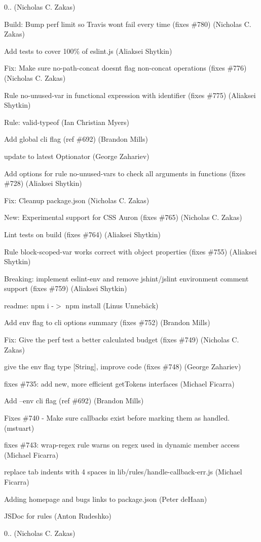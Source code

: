 \begin{DoxyItemize}
\item 0.. (Nicholas C. Zakas)
\item Build\+: Bump perf limit so Travis won\textquotesingle{}t fail every time (fixes \#780) (Nicholas C. Zakas)
\item Add tests to cover 100\% of eslint.\+js (Aliaksei Shytkin)
\item Fix\+: Make sure no-\/path-\/concat doesn\textquotesingle{}t flag non-\/concat operations (fixes \#776) (Nicholas C. Zakas)
\item Rule \textquotesingle{}no-\/unused-\/var\textquotesingle{} in functional expression with identifier (fixes \#775) (Aliaksei Shytkin)
\item Rule\+: valid-\/typeof (Ian Christian Myers)
\item Add global cli flag (ref \#692) (Brandon Mills)
\item update to latest Optionator (George Zahariev)
\item Add options for rule \textquotesingle{}no-\/unused-\/vars\textquotesingle{} to check all arguments in functions (fixes \#728) (Aliaksei Shytkin)
\item Fix\+: Cleanup package.\+json (Nicholas C. Zakas)
\item New\+: Experimental support for C\+SS Auron (fixes \#765) (Nicholas C. Zakas)
\item Lint tests on build (fixes \#764) (Aliaksei Shytkin)
\item Rule block-\/scoped-\/var works correct with object properties (fixes \#755) (Aliaksei Shytkin)
\item Breaking\+: implement eslint-\/env and remove jshint/jslint environment comment support (fixes \#759) (Aliaksei Shytkin)
\item readme\+: npm i -\/$>$ npm install (Linus Unnebäck)
\item Add env flag to cli options summary (fixes \#752) (Brandon Mills)
\item Fix\+: Give the perf test a better calculated budget (fixes \#749) (Nicholas C. Zakas)
\item give the {\ttfamily env} flag type {\ttfamily \mbox{[}String\mbox{]}}, improve code (fixes \#748) (George Zahariev)
\item fixes \#735\+: add new, more efficient get\+Tokens interfaces (Michael Ficarra)
\item Add --env cli flag (ref \#692) (Brandon Mills)
\item Fixes \#740 -\/ Make sure callbacks exist before marking them as \textquotesingle{}handled\textquotesingle{}. (mstuart)
\item fixes \#743\+: wrap-\/regex rule warns on regex used in dynamic member access (Michael Ficarra)
\item replace tab indents with 4 spaces in lib/rules/handle-\/callback-\/err.\+js (Michael Ficarra)
\item Adding homepage and bugs links to package.\+json (Peter de\+Haan)
\item J\+S\+Doc for rules (Anton Rudeshko)
\item 0.. (Nicholas C. Zakas)
\end{DoxyItemize}

